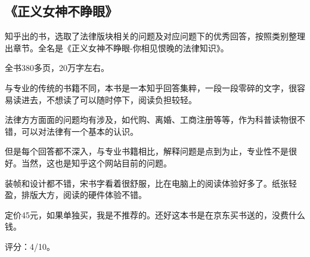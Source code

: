 \subsection{《正义女神不睁眼》}

知乎出的书，选取了法律版块相关的问题及对应问题下的优秀回答，按照类别整理出章节。全名是《正义女神不睁眼-你相见恨晚的法律知识》。

全书380多页，20万字左右。

与专业的传统的书籍不同，本书是一本知乎回答集粹，一段一段零碎的文字，很容易读进去，不想读了可以随时停下，阅读负担较轻。

法律方方面面的问题均有涉及，如代购、离婚、工商注册等等，作为科普读物很不错，可以对法律有一个基本的认识。

但是每个回答都不深入，与专业书籍相比，解释问题是点到为止，专业性不是很好。当然，这也是知乎这个网站目前的问题。

装帧和设计都不错，宋书字看着很舒服，比在电脑上的阅读体验好多了。纸张轻盈，排版大方，阅读的硬件体验不错。

定价45元，如果单独买，我是不推荐的。还好这本书是在京东买书送的，没费什么钱。

评分：4/10。